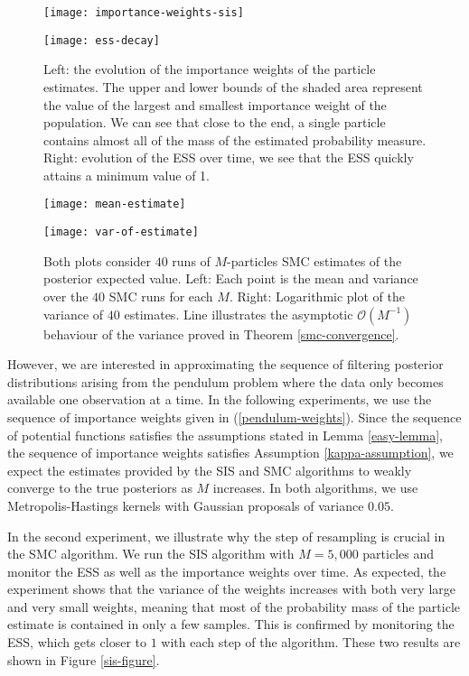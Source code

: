 \begin{figure}[htbp]
  \begin{minipage}{.5\textwidth}
    \texttt{[image: importance-weights-sis]}
  \end{minipage}
  \begin{minipage}{.5\textwidth}
    \texttt{[image: ess-decay]}
  \end{minipage}
  \caption{Left: the evolution of the importance weights of the particle estimates. The upper and lower bounds of the shaded area represent the value of the largest and smallest importance weight of the population. We can see that close to the end, a single particle contains almost all of the mass of the estimated probability measure. Right: evolution of the ESS over time, we see that the ESS quickly attains a minimum value of 1.}\label{sis-figure}

  \bigskip

  \begin{minipage}{.5\textwidth}
    \texttt{[image: mean-estimate]}
  \end{minipage}
  \begin{minipage}{.5\textwidth}
    \texttt{[image: var-of-estimate]}
  \end{minipage}
  \caption{Both plots consider $40$ runs of $M$-particles SMC estimates of the posterior expected value. Left: Each point is the mean and variance over the $40$ SMC runs for each $M$. Right: Logarithmic plot of the variance of $40$ estimates. Line illustrates the asymptotic $\mathcal{O}(M^{-1})$ behaviour of the variance proved in Theorem \ref{smc-convergence}. }
  \label{smc-figure}
\end{figure}

However, we are interested in approximating the sequence of filtering posterior distributions arising from the pendulum problem where the data only becomes available one observation at a time. In the following experiments, we use the sequence of importance weights given in (\ref{pendulum-weights}). Since the sequence of potential functions satisfies the assumptions stated in Lemma \ref{easy-lemma}, the sequence of importance weights satisfies Assumption \ref{kappa-assumption}, we expect the estimates provided by the SIS and SMC algorithms to weakly converge to the true posteriors as $M$ increases. In both algorithms, we use Metropolis-Hastings kernels with Gaussian proposals of variance $0.05$. 

In the second experiment, we illustrate why the step of resampling is crucial in the SMC algorithm. We run the SIS algorithm with $M=5,000$ particles and monitor the ESS as well as the importance weights over time. As expected, the experiment shows that the variance of the weights increases with both very large and very small weights, meaning that most of the probability mass of the particle estimate is contained in only a few samples. This is confirmed by monitoring the ESS, which gets closer to $1$ with each step of the algorithm. These two results are shown in Figure \ref{sis-figure}.

